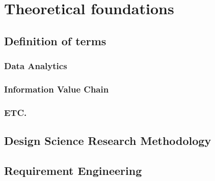 \newpage\section{Theoretical foundations}

\subsection{Definition of terms}

\subsubsection{Data Analytics}

\subsubsection{Information Value Chain}

\subsubsection{ETC.}

\subsection{Design Science Research Methodology}

\subsection{Requirement Engineering}
